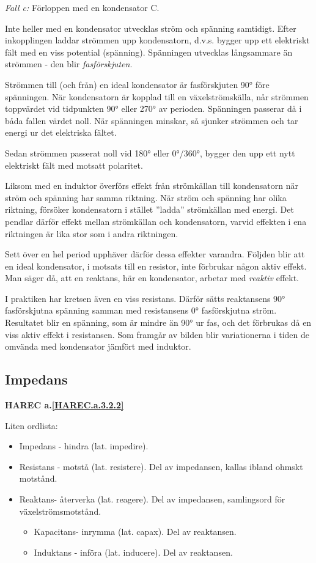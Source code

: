 \emph{Fall c:} Förloppen med en kondensator C.

Inte heller med en kondensator utvecklas ström och spänning samtidigt. Efter
inkopplingen laddar strömmen upp kondensatorn, d.v.s. bygger upp ett elektriskt
fält med en viss potential (spänning). Spänningen utvecklas långsammare än
strömmen - den blir \emph{fasförskjuten}.

Strömmen till (och från) en ideal kondensator är fasförskjuten 90° före
spänningen. När kondensatorn är kopplad till en växelströmskälla, når strömmen
toppvärdet vid tidpunkten 90° eller 270° av perioden. Spänningen passerar då i
båda fallen värdet noll. När spänningen minskar, så sjunker strömmen och tar
energi ur det elektriska fältet.

Sedan strömmen passerat noll vid 180° eller 0°/360°, bygger den upp ett nytt
elektriskt fält med motsatt polaritet.

Liksom med en induktor överförs effekt från strömkällan till kondensatorn när
ström och spänning har samma riktning. När ström och spänning har olika
riktning, försöker kondensatorn i stället ''ladda'' strömkällan med energi. Det
pendlar därför effekt mellan strömkällan och kondensatorn, varvid effekten i
ena riktningen är lika stor som i andra riktningen.

Sett över en hel period upphäver därför dessa effekter varandra. Följden blir
att en ideal kondensator, i motsats till en resistor, inte förbrukar någon
aktiv effekt. Man säger då, att en reaktans, här en kondensator, arbetar med
\emph{reaktiv} effekt.

I praktiken har kretsen även en viss resistans. Därför sätts reaktansens 90°
fasförskjutna spänning samman med resistansens 0° fasförskjutna ström.
Resultatet blir en spänning, som är mindre än 90° ur fas, och det förbrukas då
en viss aktiv effekt i resistansen. Som framgår av bilden blir variationerna i
tiden de omvända med kondensator jämfört med induktor.

\subsection{Impedans}
\textbf{HAREC a.\ref{HAREC.a.3.2.2}\label{myHAREC.a.3.2.2}}

Liten ordlista:
\begin{itemize}
\item Impedans - hindra (lat. impedire).
\item Resistans - motstå (lat. resistere).
  Del av impedansen, kallas ibland ohmskt motstånd.
\item Reaktans- återverka (lat. reagere).
  Del av impedansen, samlingsord för växelströmsmotstånd.
  \begin{itemize}
  \item Kapacitans- inrymma (lat. capax). Del av reaktansen.
  \item Induktans - införa (lat. inducere). Del av reaktansen.
  \end{itemize}
\end{itemize}

